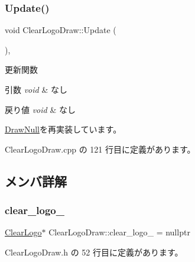 \subsubsection{\texorpdfstring{Update()}{Update()}}
{\footnotesize\ttfamily void Clear\+Logo\+Draw\+::\+Update (\begin{DoxyParamCaption}{ }\end{DoxyParamCaption})\hspace{0.3cm}{\ttfamily [override]}, {\ttfamily [virtual]}}



更新関数 


\begin{DoxyParams}{引数}
{\em void} & なし \\
\hline
\end{DoxyParams}

\begin{DoxyRetVals}{戻り値}
{\em void} & なし \\
\hline
\end{DoxyRetVals}


\mbox{\hyperlink{class_draw_null_ad32a508d269de7eda8ad24ea72230464}{Draw\+Null}}を再実装しています。



 Clear\+Logo\+Draw.\+cpp の 121 行目に定義があります。



\subsection{メンバ詳解}
\mbox{\label{class_clear_logo_draw_a9cfe2a7655dbda11e6a9719943022327}} 
\subsubsection{\texorpdfstring{clear\+\_\+logo\+\_\+}{clear\_logo\_}}
{\footnotesize\ttfamily \mbox{\hyperlink{class_clear_logo}{Clear\+Logo}}$\ast$ Clear\+Logo\+Draw\+::clear\+\_\+logo\+\_\+ = nullptr\hspace{0.3cm}{\ttfamily [private]}}



 Clear\+Logo\+Draw.\+h の 52 行目に定義があります。

\mbox{\label{class_clear_logo_draw_a556564d76190e945754e26194ef94591}} 
